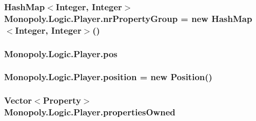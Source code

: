 \subsubsection[{\texorpdfstring{nr\+Property\+Group}{nrPropertyGroup}}]{\setlength{\rightskip}{0pt plus 5cm}Hash\+Map$<$Integer, Integer$>$ Monopoly.\+Logic.\+Player.\+nr\+Property\+Group = new Hash\+Map$<$Integer, Integer$>$()\hspace{0.3cm}{\ttfamily [private]}}\hypertarget{class_monopoly_1_1_logic_1_1_player_a939544a6ef5a533d9ef382cf6a9083ae}{}\label{class_monopoly_1_1_logic_1_1_player_a939544a6ef5a533d9ef382cf6a9083ae}
\subsubsection[{\texorpdfstring{pos}{pos}}]{ Monopoly.\+Logic.\+Player.\+pos\hspace{0.3cm}{\ttfamily [private]}}\hypertarget{class_monopoly_1_1_logic_1_1_player_a94388e91629f1f055fed991fd202e1b8}{}\label{class_monopoly_1_1_logic_1_1_player_a94388e91629f1f055fed991fd202e1b8}
\subsubsection[{\texorpdfstring{position}{position}}]{ Monopoly.\+Logic.\+Player.\+position = new {\bf Position}()\hspace{0.3cm}{\ttfamily [private]}}\hypertarget{class_monopoly_1_1_logic_1_1_player_a0ceb685e27e7d2e8aec76e6e247c94aa}{}\label{class_monopoly_1_1_logic_1_1_player_a0ceb685e27e7d2e8aec76e6e247c94aa}
\subsubsection[{\texorpdfstring{properties\+Owned}{propertiesOwned}}]{\setlength{\rightskip}{0pt plus 5cm}Vector$<${\bf Property}$>$ Monopoly.\+Logic.\+Player.\+properties\+Owned\hspace{0.3cm}{\ttfamily [private]}}\hypertarget{class_monopoly_1_1_logic_1_1_player_a76602a9679f9c17d106a8759be794432}{}\label{class_monopoly_1_1_logic_1_1_player_a76602a9679f9c17d106a8759be794432}
